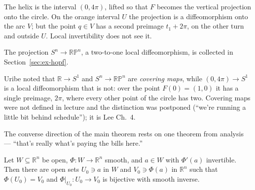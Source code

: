 \documentclass[11pt]{report}
\makeatletter
\newcounter{thmcounter}[section]
\newcommand{\thmlabel}[1]{\edef\@currentlabel{\arabic{section}.\arabic{thmcounter}}\label{#1}}
\newcommand{\leeref}[1]{\par\smallskip{\raggedleft\footnotesize\textsc{Lee}:\ #1\par}}
\makeatother
\begin{document}
\begin{center}
\end{center}

The helix is the interval $(0, 4\pi)$, lifted so that $F$ becomes the vertical projection onto the circle. On the orange interval $U$ the projection is a diffeomorphism onto the arc $V$; but the point $q \in V$ has a second preimage $t_1 + 2\pi$, on the other turn and outside $U$. Local invertibility does not see it.


The projection $S^n \to \mathbb{RP}^n$, a two-to-one local diffeomorphism, is collected in Section~\ref{sec:ex-hopf}.


\begin{rembox}\label{rem:covering-maps}
Uribe noted that $\mathbb{R} \to S^1$ and $S^n \to \mathbb{RP}^n$ are \emph{covering maps}, while $(0, 4\pi) \to S^1$ is a local diffeomorphism that is not: over the point $F(0) = (1,0)$ it has a single preimage, $2\pi$, where every other point of the circle has two. Covering maps were not defined in lecture and the distinction was postponed (``we're running a little bit behind schedule''); it is Lee Ch.\ 4.
\end{rembox}

The converse direction of the main theorem rests on one theorem from analysis --- ``that's really what's paying the bills here.''

\begin{thmbox}\thmlabel{thm:inverse-function}
Let $W \subseteq \mathbb{R}^n$ be open, $\Phi : W \to \mathbb{R}^n$ smooth, and $a \in W$ with $\Phi'(a)$ invertible. Then there are open sets $U_0 \ni a$ in $W$ and $V_0 \ni \Phi(a)$ in $\mathbb{R}^n$ such that $\Phi(U_0) = V_0$ and $\Phi|_{U_0} : U_0 \to V_0$ is bijective with smooth inverse.
\leeref{Theorem C.34}
\end{thmbox}
\end{document}
